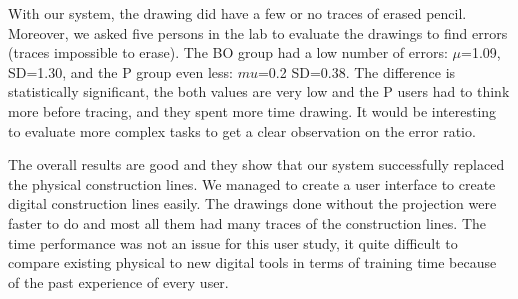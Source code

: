 \documentclass{sigchi}
\begin{document}
With our system, the drawing did have a few or no traces of erased
pencil. Moreover, we asked five persons in the lab to evaluate the
drawings to find errors (traces impossible to erase). The BO group had
a low number of errors: $\mu$=1.09, SD=1.30, and the P group even
less: $mu$=0.2 SD=0.38. 
The difference is statistically significant, the both values are very
low and the P users had to think more before tracing, and they spent
more time drawing. 
It would be interesting to evaluate more complex tasks to get a clear
observation on the error ratio. 

The overall results are good and they show that our system
successfully replaced the physical construction lines. We managed to
create a user interface to create digital construction lines easily. 
The drawings done without the projection were faster to do and most
all them had many traces of the construction lines. 
The time performance was not an issue for this user study, it quite
difficult to compare existing physical to new digital tools in terms
of training time because of the past experience of every user. 







\end{document}
